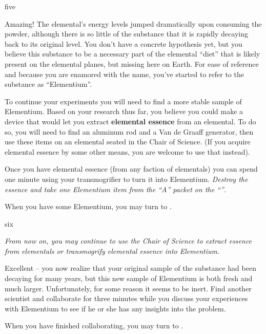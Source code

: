 \documentclass[notebook]{elementals}
\begin{document}
\begin{page}{five}

Amazing! The elemental's energy levels jumped dramatically upon consuming the powder, although there is so little of the substance that it is rapidly decaying back to its original level. You don't have a concrete hypothesis yet, but you believe this substance to be a necessary part of the elemental ``diet'' that is likely present on the elemental planes, but missing here on Earth. For ease of reference and because you are enamored with the name, you've started to refer to the substance as ``Elementium''.

To continue your experiments you will need to find a more stable sample of Elementium. Based on your research thus far, you believe you could make a device that would let you extract \textbf{elemental essence} from an elemental. To do so, you will need to find an aluminum rod and a Van de Graaff generator, then use these items on an elemental seated in the Chair of Science. (If you acquire elemental essence by some other means, you are welcome to use that instead).

Once you have elemental essence (from any faction of elementals) you can spend one minute using your transmogrifier to turn it into Elementium. \emph{Destroy the essence and take one Elementium item from the ``A'' packet on the ``\sAziSciLabBenchl{}''}.

When you have some Elementium, you may turn to .

\end{page}

\begin{page}{six}

\emph{From now on, you may continue to use the Chair of Science to extract essence from elementals or transmogrify elemental essence into Elementium.}

Excellent -- you now realize that your original sample of the substance had been decaying for many years, but this new sample of Elementium is both fresh and much larger. Unfortunately, for some reason it seems to be inert. Find another scientist and collaborate for three minutes while you discuss your experiences with Elementium to see if he or she has any insights into the problem.

When you have finished collaborating, you may turn to .

\end{page}
\end{document}
